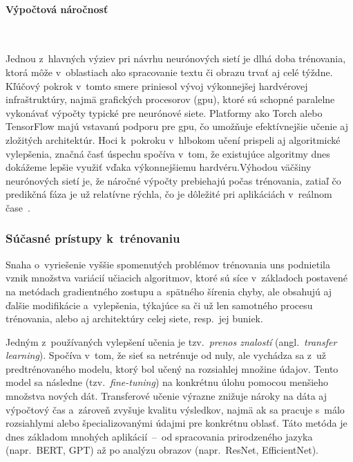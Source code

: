       \paragraph{Výpočtová náročnosť} \

        \noindent Jednou z~hlavných výziev pri návrhu neurónových sietí je dlhá doba trénovania, ktorá môže v~oblastiach ako spracovanie textu či obrazu trvať aj celé týždne. Kľúčový pokrok v~tomto smere priniesol vývoj výkonnejšej hardvérovej infraštruktúry, najmä grafických procesorov (\acrshort{gpu}), ktoré sú schopné paralelne vykonávať výpočty typické pre neurónové siete. Platformy ako Torch alebo TensorFlow majú vstavanú podporu pre \acrshort{gpu}, čo umožňuje efektívnejšie učenie aj zložitých architektúr. Hoci k~pokroku v~hlbokom učení prispeli aj algoritmické vylepšenia, značná časť úspechu spočíva v~tom, že existujúce algoritmy dnes dokážeme lepšie využiť vďaka výkonnejšiemu hardvéru.Výhodou väčšiny neurónových sietí je, že náročné výpočty prebiehajú počas trénovania, zatiaľ čo predikčná fáza je už relatívne rýchla, čo je dôležité pri aplikáciách v~reálnom čase~\cite{aggarwalNeuralNetworksDeep2018}.
  
  
    \subsubsection{Súčasné prístupy k~trénovaniu}

      Snaha o~vyriešenie vyššie spomenutých problémov trénovania \acrshort{uns} podnietila vznik množstva variácií učiacich algoritmov, ktoré sú síce v~základoch postavené na metódach gradientného zostupu a~spätného šírenia chyby, ale obsahujú aj ďalšie modifikácie a~vylepšenia, týkajúce sa či už len samotného procesu trénovania, alebo aj architektúry celej siete, resp.\ jej buniek.

      Jedným z~používaných vylepšení učenia je tzv.\ \emph{prenos znalostí} (angl.\ \emph{transfer learning}). Spočíva v~tom, že sieť sa netrénuje od nuly, ale vychádza sa z~už predtrénovaného modelu, ktorý bol učený na rozsiahlej množine údajov. Tento model sa následne  (tzv.\ \emph{fine-tuning}) na konkrétnu úlohu pomocou menšieho množstva nových dát. Transferové učenie výrazne znižuje nároky na dáta aj výpočtový čas a~zároveň zvyšuje kvalitu výsledkov, najmä ak sa pracuje s~málo rozsiahlymi alebo špecializovanými údajmi pre konkrétnu oblasť. Táto metóda je dnes základom mnohých aplikácií~--~od spracovania prirodzeného jazyka (napr.\ BERT, GPT) až po analýzu obrazov (napr.\ ResNet, EfficientNet).

